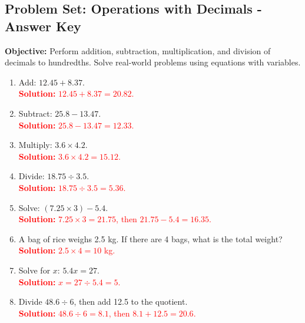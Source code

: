 \documentclass[11pt]{article}
\title{}
\date{}
\begin{document}
\subsection*{Problem Set: Operations with Decimals - Answer Key}
\onehalfspacing

\begin{tcolorbox}[colframe=black!40, colback=gray!5, 
coltitle=black, colbacktitle=black!20, fonttitle=\bfseries\Large, 
title=Learning Objective, halign title=center, left=5pt, right=5pt, top=5pt, bottom=15pt]
\textbf{Objective:} Perform addition, subtraction, multiplication, and division of decimals to hundredths. Solve real-world problems using equations with variables.
\end{tcolorbox}

\begin{tcolorbox}[colframe=black!60, colback=white, 
coltitle=black, colbacktitle=black!15, fonttitle=\bfseries\Large, 
title=Exercises, halign title=center, left=10pt, right=10pt, top=10pt, bottom=60pt]
\begin{enumerate}[itemsep=3.5em]
    \item Add: \( 12.45 + 8.37 \).\\
    \textcolor{red}{\textbf{Solution:} \( 12.45 + 8.37 = 20.82 \).}

    \item Subtract: \( 25.8 - 13.47 \).\\
    \textcolor{red}{\textbf{Solution:} \( 25.8 - 13.47 = 12.33 \).}

    \item Multiply: \( 3.6 \times 4.2 \).\\
    \textcolor{red}{\textbf{Solution:} \( 3.6 \times 4.2 = 15.12 \).}

    \item Divide: \( 18.75 \div 3.5 \).\\
    \textcolor{red}{\textbf{Solution:} \( 18.75 \div 3.5 = 5.36 \).}

    \item Solve: \( (7.25 \times 3) - 5.4 \).\\
    \textcolor{red}{\textbf{Solution:} \( 7.25 \times 3 = 21.75 \), then \( 21.75 - 5.4 = 16.35 \).}

    \item A bag of rice weighs 2.5 kg. If there are 4 bags, what is the total weight?\\
    \textcolor{red}{\textbf{Solution:} \( 2.5 \times 4 = 10 \) kg.}

    \item Solve for \( x \): \( 5.4x = 27 \).\\
    \textcolor{red}{\textbf{Solution:} \( x = 27 \div 5.4 = 5 \).}

    \item Divide \( 48.6 \div 6 \), then add 12.5 to the quotient.\\
    \textcolor{red}{\textbf{Solution:} \( 48.6 \div 6 = 8.1 \), then \( 8.1 + 12.5 = 20.6 \).}
\end{enumerate}
\end{tcolorbox}
\end{document}
